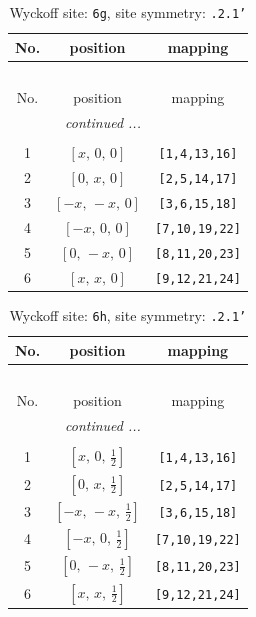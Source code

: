 \documentclass[fleqn,8pt]{jsarticle}
\begin{document}
\begin{longtable}{ccc}
\caption{Wyckoff site: {\tt 6g}, site symmetry: {\tt .2.1'}}
 \\
 \hline \hline
No. & position & mapping \\ \hline \endfirsthead

\multicolumn{2}{l}{\tablename\ \thetable{}} \\
 \hline \hline
No. & position & mapping \\ \hline \endhead

 \hline \hline
\multicolumn{2}{r}{\footnotesize\it continued ...} \\ \endfoot

 \hline \hline
\multicolumn{2}{r}{} \\ \endlastfoot

1 & $\left[ x,\, 0,\, 0 \right]$ & {\tt [1,4,13,16]} \\ \hline
2 & $\left[ 0,\, x,\, 0 \right]$ & {\tt [2,5,14,17]} \\ \hline
3 & $\left[ - x,\, - x,\, 0 \right]$ & {\tt [3,6,15,18]} \\ \hline
4 & $\left[ - x,\, 0,\, 0 \right]$ & {\tt [7,10,19,22]} \\ \hline
5 & $\left[ 0,\, - x,\, 0 \right]$ & {\tt [8,11,20,23]} \\ \hline
6 & $\left[ x,\, x,\, 0 \right]$ & {\tt [9,12,21,24]} \\
\end{longtable}
\renewcommand{\arraystretch}{1.2}
\begin{longtable}{ccc}
\caption{Wyckoff site: {\tt 6h}, site symmetry: {\tt .2.1'}}
 \\
 \hline \hline
No. & position & mapping \\ \hline \endfirsthead

\multicolumn{2}{l}{\tablename\ \thetable{}} \\
 \hline \hline
No. & position & mapping \\ \hline \endhead

 \hline \hline
\multicolumn{2}{r}{\footnotesize\it continued ...} \\ \endfoot

 \hline \hline
\multicolumn{2}{r}{} \\ \endlastfoot

1 & $\left[ x,\, 0,\, \frac{1}{2} \right]$ & {\tt [1,4,13,16]} \\ \hline
2 & $\left[ 0,\, x,\, \frac{1}{2} \right]$ & {\tt [2,5,14,17]} \\ \hline
3 & $\left[ - x,\, - x,\, \frac{1}{2} \right]$ & {\tt [3,6,15,18]} \\ \hline
4 & $\left[ - x,\, 0,\, \frac{1}{2} \right]$ & {\tt [7,10,19,22]} \\ \hline
5 & $\left[ 0,\, - x,\, \frac{1}{2} \right]$ & {\tt [8,11,20,23]} \\ \hline
6 & $\left[ x,\, x,\, \frac{1}{2} \right]$ & {\tt [9,12,21,24]} \\
\end{longtable}
\end{document}
